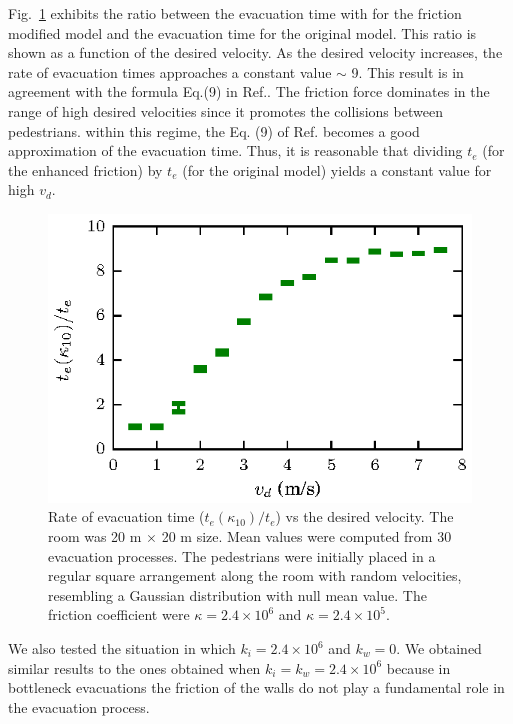 \documentclass[preprint,12pt]{elsarticle}
\begin{document}
Fig.~\ref{rate_fis} exhibits the ratio between the evacuation time with for the friction modified model and the evacuation time for the original model. This ratio is shown as a function of the desired velocity. As the desired velocity increases, the rate of evacuation times approaches a constant value $\sim$ 9. This result is in agreement with the formula Eq.(9) in Ref.\cite{sticco}. The friction force dominates in the range of high desired velocities since it promotes the collisions between pedestrians. within this regime, the Eq. (9) of  Ref. \cite{sticco} becomes a good approximation of the evacuation time. Thus, it is reasonable that dividing $t_e$ (for the enhanced friction) by $t_e$ (for the original model) yields a constant value for high $v_d$.  

\begin{figure}[htbp!]
\centering
\includegraphics[width=0.7\columnwidth]
{./fis_cociente.eps}
\caption{\label{rate_fis} Rate of evacuation time ($t_e(\kappa_{10})/t_e$) vs the desired velocity. The room was 20 m $\times$ 20 m size. Mean values were computed from 30 evacuation processes. The pedestrians were initially placed in a regular square arrangement along the room with random velocities, resembling a Gaussian distribution with null mean value. The friction coefficient were $\kappa=2.4\times10^{6}$ and $\kappa=2.4\times10^{5}$. }
\end{figure}

We also tested the situation in which $k_i=2.4\times 10^{6}$ and $k_w=0$. We obtained similar results to the ones obtained when $k_i=k_w=2.4\times 10^{6}$ because in bottleneck evacuations the friction of the walls do not play a fundamental role in the evacuation process. 

\end{document}
